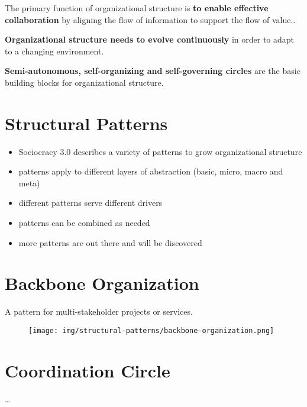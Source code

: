 The primary function of organizational structure is \textbf{to enable effective collaboration} by aligning the flow of information to support the flow of value..

\textbf{Organizational structure needs to evolve continuously} in order to adapt to a changing environment.

\textbf{Semi-autonomous, self-organizing and self-governing circles} are the basic building blocks for organizational structure.

\section{Structural Patterns}
\label{structuralpatterns}

\begin{itemize}
\item Sociocracy 3.0 describes a variety of patterns to grow organizational structure

\item patterns apply to different layers of abstraction (basic, micro, macro and meta)

\item different patterns serve different drivers

\item patterns can be combined as needed

\item more patterns are out there and will be discovered

\end{itemize}

\section{Backbone Organization}
\label{backboneorganization}

A pattern for multi-stakeholder projects or services.

\begin{figure}[htbp]
\centering
\texttt{[image: img/structural-patterns/backbone-organization.png]}
\end{figure}

\section{Coordination Circle}
\label{coordinationcircle}

{\ldots}

